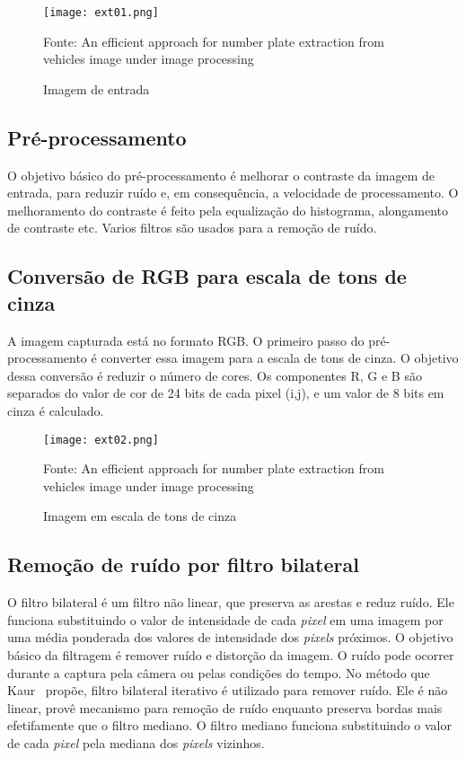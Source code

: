 \begin{figure}[H]
	\centering
	\texttt{[image: ext01.png]}
	\caption{Imagem de entrada}
Fonte: An efficient approach for number plate extraction from vehicles image under image processing~\cite{kaur2014efficient}
	\label{fig:ext_input_image}
\end{figure}

\subsection{Pré-processamento}

O objetivo básico do pré-processamento é melhorar o contraste da imagem de
entrada, para reduzir ruído e, em consequência, a velocidade de
processamento. O melhoramento do contraste é feito pela equalização do
histograma, alongamento de contraste etc. Varios filtros são usados para a
remoção de ruído.

\subsection{Conversão de RGB para escala de tons de cinza}

A imagem capturada está no formato RGB\@. O primeiro passo do pré-processamento é
converter essa imagem para a escala de tons de cinza. O objetivo dessa conversão é reduzir
o número de cores. Os componentes R, G e B são separados do valor de cor de 24
bits de cada pixel (i,j), e um valor de 8 bits em cinza é calculado.

\begin{figure}[H]
	\centering
	\texttt{[image: ext02.png]}
	\caption{Imagem em escala de tons de cinza}
Fonte: An efficient approach for number plate extraction from vehicles image under image processing~\cite{kaur2014efficient}
	\label{fig:ext_gray_scale}
\end{figure}

\subsection{Remoção de ruído por filtro bilateral}

O filtro bilateral é um filtro não linear, que preserva as arestas e reduz ruído.
Ele funciona substituindo o valor de intensidade de cada \emph{pixel} em uma imagem
por uma média ponderada dos valores de intensidade dos \emph{pixels} próximos.
O objetivo básico da filtragem é remover ruído e distorção da imagem. O ruído
pode ocorrer durante a captura pela câmera ou pelas condições do tempo. No
método que Kaur~\cite{kaur2014efficient} propõe, filtro bilateral iterativo é
utilizado para remover ruído. Ele é não linear, provê mecanismo para remoção de
ruído enquanto preserva bordas mais efetifamente que o filtro mediano. O filtro
mediano funciona substituindo o valor de cada \emph{pixel} pela mediana dos \emph{pixels}
vizinhos.

